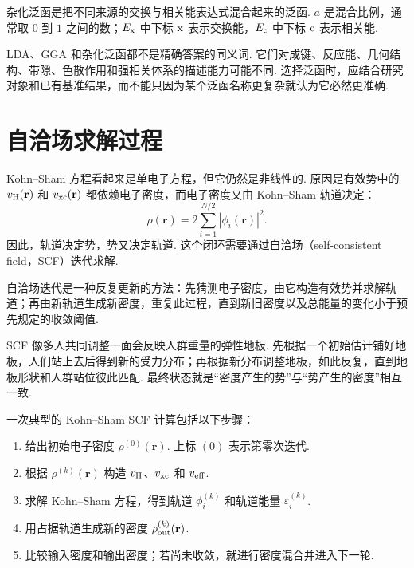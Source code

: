 \documentclass[UTF8,11pt,a4paper,openany]{ctexbook}
\begin{document}
\begin{notationbox}
杂化泛函是把不同来源的交换与相关能表达式混合起来的泛函. $a$ 是混合比例，通常取 $0$ 到 $1$ 之间的数；$E_{\rm x}$ 中下标 $\rm x$ 表示交换能，$E_{\rm c}$ 中下标 $\rm c$ 表示相关能. 
\end{notationbox}

\begin{limitbox}
LDA、GGA 和杂化泛函都不是精确答案的同义词. 它们对成键、反应能、几何结构、带隙、色散作用和强相关体系的描述能力可能不同. 选择泛函时，应结合研究对象和已有基准结果，而不能只因为某个泛函名称更复杂就认为它必然更准确. 
\end{limitbox}

\section{自洽场求解过程}

Kohn--Sham 方程看起来是单电子方程，但它仍然是非线性的. 原因是有效势中的 $v_{\rm H}(\mathbf r)$ 和 $v_{\rm xc}(\mathbf r)$ 都依赖电子密度，而电子密度又由 Kohn--Sham 轨道决定：
\[
\rho(\mathbf r)
=
2\sum_{i=1}^{N/2}|\phi_i(\mathbf r)|^2.
\]
因此，轨道决定势，势又决定轨道. 这个闭环需要通过自洽场（self-consistent field，SCF）迭代求解. 

\begin{definitionbox}
自洽场迭代是一种反复更新的方法：先猜测电子密度，由它构造有效势并求解轨道；再由新轨道生成新密度，重复此过程，直到新旧密度以及总能量的变化小于预先规定的收敛阈值. 
\end{definitionbox}

\begin{analogybox}
SCF 像多人共同调整一面会反映人群重量的弹性地板. 先根据一个初始估计铺好地板，人们站上去后得到新的受力分布；再根据新分布调整地板，如此反复，直到地板形状和人群站位彼此匹配. 最终状态就是“密度产生的势”与“势产生的密度”相互一致. 
\end{analogybox}

一次典型的 Kohn--Sham SCF 计算包括以下步骤：

\begin{enumerate}
\item 给出初始电子密度 $\rho^{(0)}(\mathbf r)$. 上标 $(0)$ 表示第零次迭代. 
\item 根据 $\rho^{(k)}(\mathbf r)$ 构造 $v_{\rm H}$、$v_{\rm xc}$ 和 $v_{\rm eff}$. 
\item 求解 Kohn--Sham 方程，得到轨道 $\phi_i^{(k)}$ 和轨道能量 $\varepsilon_i^{(k)}$. 
\item 用占据轨道生成新的密度 $\rho_{\rm out}^{(k)}(\mathbf r)$. 
\item 比较输入密度和输出密度；若尚未收敛，就进行密度混合并进入下一轮. 
\end{enumerate}
\end{document}
